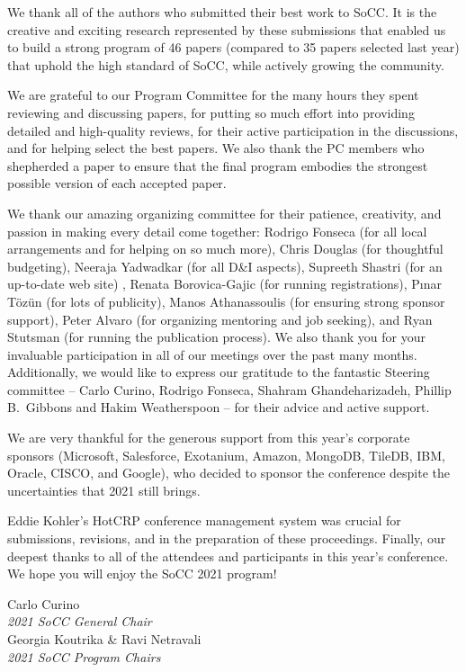 We thank all of the authors who submitted their best work to SoCC. It is the creative and exciting research represented by these submissions that enabled us to build a strong program of 46 papers (compared to 35 papers selected last year) that uphold the high standard of SoCC, while actively growing the community.

We are grateful to our Program Committee for the many hours they spent reviewing and discussing papers, for putting so much effort into providing detailed and high-quality reviews, for their active participation in the discussions, and for helping select the best papers. We also thank the PC members who shepherded a paper to ensure that the final program embodies the strongest possible version of each accepted paper.

We thank our amazing organizing committee for their patience, creativity, and passion in making every detail come together: Rodrigo Fonseca (for all local arrangements and for helping on so much more), Chris Douglas (for thoughtful budgeting), Neeraja Yadwadkar (for all D\&I aspects),  Supreeth Shastri (for an up-to-date web site) , Renata Borovica-Gajic (for running registrations), Pınar Tözün (for lots of publicity), Manos Athanassoulis (for ensuring strong sponsor support), Peter Alvaro (for organizing mentoring and job seeking), and Ryan Stutsman (for running the publication process). We also thank you for your invaluable participation in all of our meetings over the past many months.  Additionally, we would like to express our gratitude to the fantastic Steering committee -- Carlo Curino, Rodrigo Fonseca, Shahram Ghandeharizadeh, Phillip B.\ Gibbons and Hakim Weatherspoon -- for their advice and active support. 

We are very thankful for the generous support from this year's corporate sponsors (Microsoft, Salesforce, Exotanium, Amazon, MongoDB, TileDB, IBM, Oracle, CISCO, and Google), who decided to sponsor the conference despite the uncertainties that 2021 still brings. 

Eddie Kohler's HotCRP conference management system was crucial for submissions, revisions, and in the preparation of these proceedings. Finally, our deepest thanks to all of the attendees and participants in this year's conference.   We hope you will enjoy the SoCC 2021 program!

\begin{flushright}
Carlo Curino\\
\emph{2021 SoCC General Chair}\\\vspace{0.5em}
Georgia Koutrika \& Ravi Netravali \\
\emph{2021 SoCC Program Chairs}
\end{flushright}


